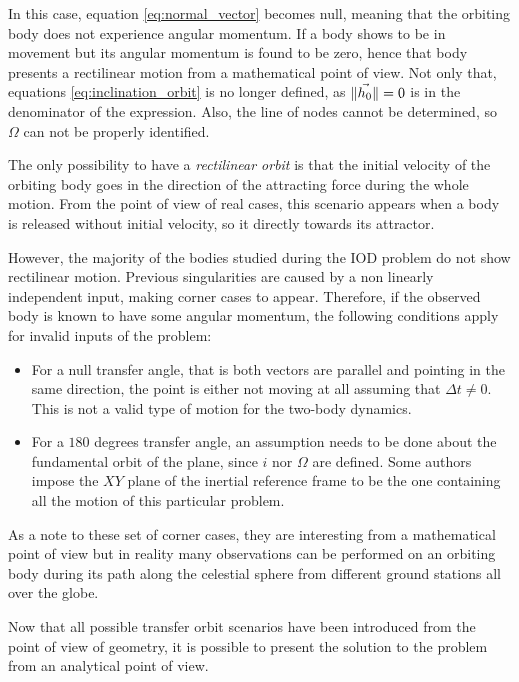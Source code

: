In this case, equation \ref{eq:normal_vector} becomes null, meaning that the
orbiting body does not experience angular momentum. If a body shows to be in
movement but its angular momentum is found to be zero, hence that body presents
a rectilinear motion from a mathematical point of view. Not only that, equations
\ref{eq:inclination_orbit} is no longer defined, as $\lVert\vec{h_{0}}\rVert=0$ is in
the denominator of the expression. Also, the line of nodes cannot be determined,
so $\Omega$ can not be properly identified.

The only possibility to have a \textit{rectilinear orbit} is that the initial
velocity of the orbiting body goes in the direction of the attracting force
during the whole motion. From the point of view of real cases, this scenario
appears when a body is released without initial velocity, so it directly towards
its attractor.

However, the majority of the bodies studied during the IOD problem do not show
rectilinear motion. Previous singularities are caused by a non linearly
independent input, making corner cases to appear. Therefore, if the observed
body is known to have some angular momentum, the following conditions apply for
invalid inputs of the problem:

\begin{itemize}
  \item For a null transfer angle, that is both vectors are parallel and pointing
        in the same direction, the point is either not moving at all assuming that
        $\Delta t \neq 0$. This is not a valid type of motion for the two-body
        dynamics.
  \item For a $180$ degrees transfer angle, an assumption needs to be done about
        the fundamental orbit of the plane, since $i$ nor $\Omega$ are defined.
        Some authors impose the $XY$ plane of the inertial reference frame to be
        the one containing all the motion of this particular problem.
\end{itemize}

As a note to these set of corner cases, they are interesting from a mathematical
point of view but in reality many observations can be performed on an orbiting
body during its path along the celestial sphere from different ground stations
all over the globe.

Now that all possible transfer orbit scenarios have been introduced from the
point of view of geometry, it is possible to present the solution to the problem
from an analytical point of view.

